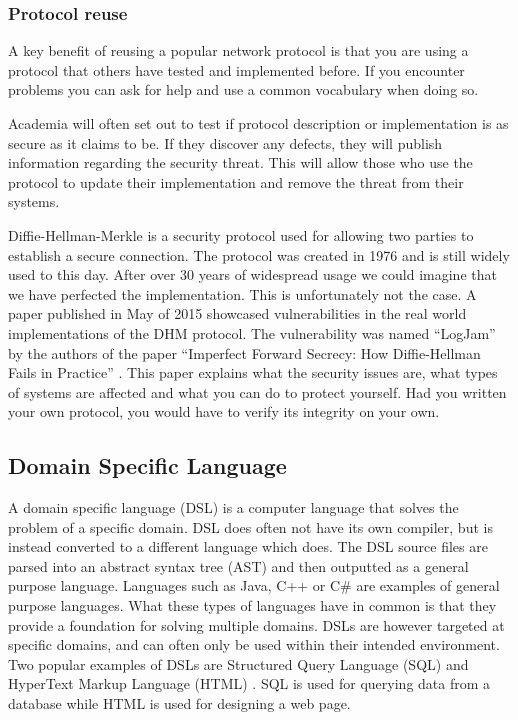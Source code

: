 \subsubsection{Protocol reuse}
A key benefit of reusing a popular network protocol is that you are using a protocol that others have tested and implemented before. If you encounter problems you can ask for help and use a common vocabulary when doing so.

Academia will often set out to test if protocol description or implementation is as secure as it claims to be. If they discover any defects, they will publish information regarding the security threat. This will allow those who use the protocol to update their implementation and remove the threat from their systems.

Diffie-Hellman-Merkle \cite{diffie1976new} is a security protocol used for allowing two parties to establish a secure connection. The protocol was created in 1976 and is still widely used to this day. After over 30 years of widespread usage we could imagine that we have perfected the implementation. This is unfortunately not the case. A paper published in May of 2015 showcased vulnerabilities in the real world implementations of the DHM protocol. The vulnerability was named ``LogJam'' by the authors of the paper ``Imperfect Forward Secrecy: How Diffie-Hellman Fails in Practice'' \cite{logjam2015}. This paper explains what the security issues are, what types of systems are affected and what you can do to protect yourself. Had you written your own protocol, you would have to verify its integrity on your own.  

\iffalse
Additionally, due
to a breakdown in communication between cryptographers
and system implementers, there is evidence that suggests
the way we are using Diffie-Hellman in today’s protocols is
insufficient to protect against state-level actors
\fi

\subsection{Domain Specific Language}
A domain specific language (DSL) \cite{fowler2010domain} is a computer language that solves the problem of a specific domain. DSL does often not have its own compiler, but is instead converted to a different language which does. The DSL source files are parsed into an abstract syntax tree (AST) and then outputted as a general purpose language. Languages such as Java, C++ or C\# are examples of general purpose languages. What these types of languages have in common is that they provide a foundation for solving multiple domains. DSLs are however targeted at specific domains, and can often only be used within their intended environment. Two popular examples of DSLs are Structured Query Language (SQL) and HyperText Markup Language (HTML) \cite{mernik2005and}. SQL is used for querying data from a database while HTML is used for designing a web page.

